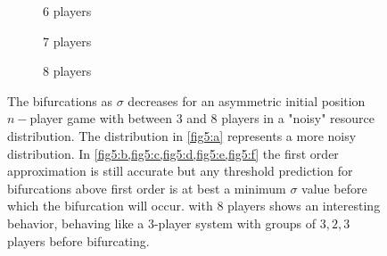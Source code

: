 \documentclass{article}
\begin{document}
\begin{figure}[ht!]
                    
                    \begin{subfigure}[b]{0.3\linewidth}
                        \centering
                         
                        \caption{6 players }  
                        \label{fig5:e} 
                        \vspace{4ex}
                    \end{subfigure}
                    \begin{subfigure}[b]{0.3\linewidth}
                        \centering
                         
                        \caption{7 players} 
                        \label{fig5:f} 
                        \vspace{4ex}
                    \end{subfigure}
                    \begin{subfigure}[b]{0.3\linewidth}
                        \centering
                         
                        \caption{8 players } 
                        \label{fig5:g}
                        \vspace{4ex}
                    \end{subfigure} 
                    \caption{The bifurcations as $\sigma$ decreases for an asymmetric initial position $n-$player game with between 3 and 8 players in a "noisy" resource distribution. The distribution in \cref{fig5:a} represents a more noisy distribution. In \cref{fig5:b,fig5:c,fig5:d,fig5:e,fig5:f} the first order approximation is still accurate but any threshold prediction for bifurcations above first order is at best a minimum $\sigma$ value before which the bifurcation will occur.  with 8 players shows an interesting behavior, behaving like a 3-player system with groups of $3,2,3$ players before bifurcating. }
                    \label{fig5} 
                \end{figure}
                \clearpage
                
\end{document}
